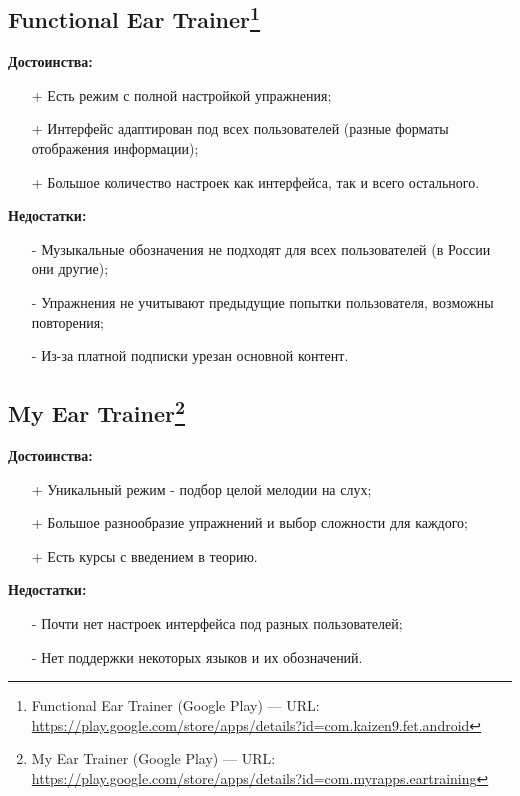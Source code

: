 \subsection[Functional Ear Trainer]{Functional Ear Trainer\footnote{Functional Ear Trainer (Google Play) --- URL: \url{https://play.google.com/store/apps/details?id=com.kaizen9.fet.android}}}
\begin{minipage}[t]{0.45\textwidth}
\textbf{Достоинства:}
\begin{itemize}
  \item[+] Есть режим с полной настройкой упражнения;
  \item[+] Интерфейс адаптирован под всех пользователей (разные форматы отображения информации);
  \item[+] Большое количество настроек как интерфейса, так и всего остального.
\end{itemize}
\end{minipage}
\hfill
\begin{minipage}[t]{0.45\textwidth}
\textbf{Недостатки:}
\begin{itemize}
  \item[-] Музыкальные обозначения не подходят для всех пользователей (в России они другие);
  \item[-] Упражнения не учитывают предыдущие попытки пользователя, возможны повторения;
  \item[-] Из-за платной подписки урезан основной контент.
\end{itemize}
\end{minipage}

\subsection[My Ear Trainer]{My Ear Trainer\footnote{My Ear Trainer (Google Play) --- URL: \url{https://play.google.com/store/apps/details?id=com.myrapps.eartraining}}}
\begin{minipage}[t]{0.45\textwidth}
\textbf{Достоинства:}
\begin{itemize}
  \item[+] Уникальный режим - подбор целой мелодии на слух;
  \item[+] Большое разнообразие упражнений и выбор сложности для каждого;
  \item[+] Есть курсы с введением в теорию.
\end{itemize}
\end{minipage}
\hfill
\begin{minipage}[t]{0.45\textwidth}
\textbf{Недостатки:}
\begin{itemize}
  \item[-] Почти нет настроек интерфейса под разных пользователей;
  \item[-] Нет поддержки некоторых языков и их обозначений.
\end{itemize}
\end{minipage}

